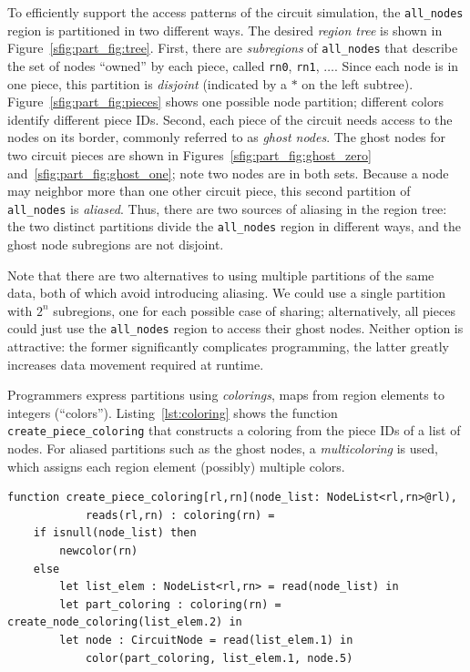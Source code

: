 To efficiently support the access patterns of the circuit simulation,
the {\tt all\_nodes} region is partitioned in two different ways.  The
desired {\em region tree} is shown in Figure~\ref{sfig:part_fig:tree}.
First, there are {\em subregions} of {\tt all\_nodes} that describe
the set of nodes ``owned'' by each piece, called {\tt rn0}, {\tt rn1},
$\ldots$. Since each node is in one piece, this partition is {\em
disjoint} (indicated by a $*$ on the left subtree).
Figure~\ref{sfig:part_fig:pieces} shows one possible node partition;
different colors identify different piece IDs.  Second, each piece of
the circuit needs access to the nodes on its border, commonly referred
to as {\em ghost nodes}.  The ghost nodes for two circuit pieces are
shown in Figures~\ref{sfig:part_fig:ghost_zero}
and~\ref{sfig:part_fig:ghost_one}; note two nodes are in both sets.
Because a node may neighbor more than one other circuit piece, this
second partition of {\tt all\_nodes} is {\em aliased}.  Thus, there
are two sources of aliasing in the region tree: the two distinct partitions
divide the {\tt all\_nodes} region in different ways, and the ghost
node subregions are not disjoint.

Note that there are two alternatives to using multiple partitions of the same data, both of which avoid introducing aliasing.
We could use a single partition with $2^n$ subregions, one for each
possible case of sharing; alternatively, all pieces could just use the
{\tt all\_nodes} region to access their ghost nodes.  Neither option
is attractive: the former significantly complicates programming, the
latter greatly increases data movement required at
runtime.

Programmers express partitions using {\em colorings},
maps from region elements to integers (``colors'').
Listing~\ref{lst:coloring} shows the function {\tt create\_piece\_coloring}
that constructs a coloring from the piece IDs of a list of nodes.
For aliased partitions such as the ghost nodes, a {\em multicoloring}
is used, which assigns each region element (possibly) multiple colors.  
\begin{lstlisting}[label={lst:coloring},caption={Coloring Construction}]
function create_piece_coloring[rl,rn](node_list: NodeList<rl,rn>@rl),
            reads(rl,rn) : coloring(rn) = 
    if isnull(node_list) then
        newcolor(rn) 
    else
        let list_elem : NodeList<rl,rn> = read(node_list) in
        let part_coloring : coloring(rn) = create_node_coloring(list_elem.2) in
        let node : CircuitNode = read(list_elem.1) in
            color(part_coloring, list_elem.1, node.5)
\end{lstlisting}

